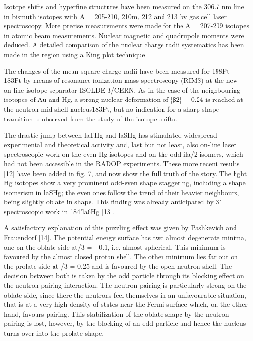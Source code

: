 Isotope shifts and hyperfine structures have been measured on the 306.7 nm line in bismuth isotopes with A = 205-210, 210m, 212 and 213 by gas cell laser spectroscopy. More precise measurements were made for the A = 207-209 isotopes in atomic beam measurements. Nuclear magnetic and quadrupole moments were deduced. A detailed comparison of the nuclear charge radii systematics has been made in the region using a King plot technique

The changes of the mean-square charge radii have been measured for 198Pt-183Pt by means of resonance ionization mass spectroscopy (RIMS) at the new on-line isotope separator ISOLDE-3/CERN. As in the case of the neighbouring isotopes of Au and Hg, a strong nuclear deformation of ¦β2¦ −-0.24 is reached at the neutron mid-shell nucleus183Pt, but no indication for a sharp shape transition is observed from the study of the isotope shifts.




The drastic jump between laTHg and laSHg has stimulated widespread experimental
and theoretical activity and, last but not least, also on-line laser spectroscopic
work on the even Hg isotopes and on the odd ila/2 isomers, which had not been
accessible in the RADOP experiments. These more recent results [12] have been
added in fig. 7, and now show the full truth of the story. The light Hg isotopes show a
very prominent odd-even shape staggering, including a shape isomerism in laSHg; the
even ones follow the trend of their heavier neighbours, being slightly oblate in shape.
This finding was already anticipated by 3" spectroscopic work in 184'la6Hg [13]. 

A satisfactory explanation of this puzzling effect was given by Pashkevich
and Frauendorf [14]. The potential energy surface has two almost degenerate minima,
one on the oblate side at/3 = - 0.1, i.e. almost spherical. This minimum is favoured
by the almost closed proton shell. The other minimum lies far out on the prolate side
at /3 = 0.25 and is favoured by the open neutron shell. The decision between both is
taken by the odd particle through its blocking effect on the neutron pairing interaction.
The neutron pairing is particularly strong on the oblate side, since there the
neutrons feel themselves in an unfavourable situation, that is at a very high density
of states near the Fermi surface which, on the other hand, favours pairing. This stabilization
of the oblate shape by the neutron pairing is lost, however, by the blocking of
an odd particle and hence the nucleus turns over into the prolate shape. 

